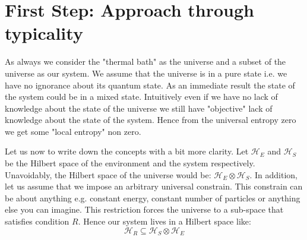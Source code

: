 \documentclass[a4paper,12pt]{article}
\begin{document}
\section{First Step: Approach through typicality}
As always we consider the "thermal bath" as the universe and a subset of the universe as our system. We assume that the universe is in a pure state i.e. we have no ignorance about its quantum state. As an immediate result the state of the system could be in a mixed state. Intuitively even if we have no lack of knowledge about the state of the universe we still have "objective" lack of knowledge about the state of the system. Hence from the universal entropy zero we get some "local entropy" non zero. \par
Let us now to write down the concepts with a bit more clarity. Let $\mathcal{H}_{E}$ and $\mathcal{H}_{S}$ 
be the Hilbert space of the environment and the system respectively. Unavoidably, the Hilbert space of the universe would be: $\mathcal{H}_{E}\otimes \mathcal{H}_{S}$. In addition, let us assume that we impose an arbitrary universal constrain. This constrain can be about anything e.g. constant energy, constant number of particles or anything else you can imagine. This restriction forces the universe to a sub-space that satisfies condition $R$. Hence our system lives in a Hilbert space like:
\begin{equation}\mathcal{H}_{R} \subseteq \mathcal{H}_{S} \otimes \mathcal{H}_{E}
\end{equation}
\end{document}
